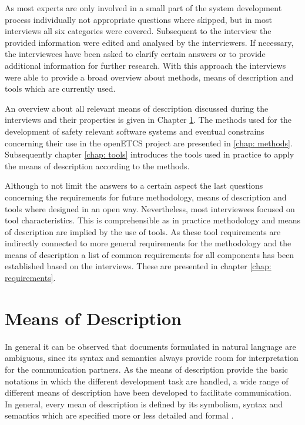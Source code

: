 \documentclass{./template/openetcs_report}
\begin{document}
As most  experts are only involved in a small part of the system development process individually not appropriate questions where skipped,  but in most interviews all six categories were covered. Subsequent to the interview the provided information were edited and analysed by the interviewers. If necessary, the interviewees have been asked to clarify certain answers or to provide additional information for further research. With this approach the interviews were able to provide a broad overview about methods, means of description and tools which are currently used.

An overview about all relevant means of description discussed during the interviews and their properties is given in Chapter \ref{chap: MoD}. The methods used for the development of safety relevant software systems and eventual constrains concerning their use in the openETCS project are presented in \ref{chap: methods}. Subsequently chapter \ref{chap: tools} introduces the tools used in practice to apply the means of description according to the methods.

Although to not limit the answers to a certain aspect the last questions concerning the requirements for future methodology, means of description and tools where designed in an open way. Nevertheless, most interviewees focused on tool characteristics. This is comprehensible as in practice  methodology and means of description are implied by the use of tools. As these tool requirements are indirectly connected to more general requirements for the methodology and the means of description a list of common requirements for all components has been established based on the interviews. These are presented in chapter \ref{chap: requirements}.

\chapter{Means of Description}

\label{chap: MoD}

In general it can be observed that documents formulated in natural language are ambiguous, since its syntax and semantics always provide room for interpretation for the communication partners. As the means of description provide the basic notations in which the different development task are handled, a wide range of different means of description have been developed to facilitate communication. In general, every mean of description is defined by its symbolism, syntax and semantics which are specified more or less detailed and formal \citep{Schnieder.2003, Schnieder.2010}.  
\end{document}
